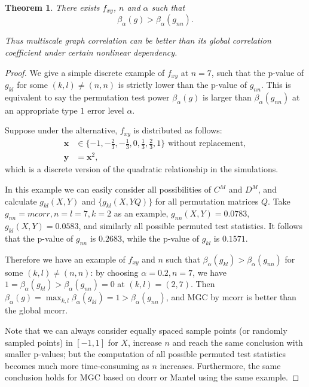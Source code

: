 \documentclass[11pt]{article}
\providecommand{\mb}[1]{\boldsymbol{#1}}
\newtheorem{thm}{Theorem}
\begin{document}
\begin{thm}
There exists $f_{xy}$, $n$ and $\alpha$ such that 
\begin{equation}
\beta_{\alpha}(g) > \beta_{\alpha}(g_{nn}).
\end{equation}

Thus multiscale graph correlation can be better than its global correlation coefficient under certain nonlinear dependency.
\end{thm}
\begin{proof}
We give a simple discrete example of $f_{xy}$ at $n=7$, such that the p-value of $g_{kl}$ for some $(k,l) \neq (n,n)$ is strictly lower than the p-value of $g_{nn}$. This is equivalent to say the permutation test power $\beta_{\alpha}(g)$ is larger than $\beta_{\alpha}(g_{nn})$ at an appropriate type $1$ error level $\alpha$.

Suppose under the alternative, $f_{xy}$ is distributed as follows:
\begin{align*} 
\mb{x} &\in \{-1,-\frac{2}{3},-\frac{1}{3},0,\frac{1}{3},\frac{2}{3},1\} \mbox{ without replacement}, \\
\mb{y} &= \mb{x}^2,
\end{align*}
which is a discrete version of the quadratic relationship in the simulations.

In this example we can easily consider all possibilities of $C^{M}$ and $D^{M}$, and calculate $g_{kl}(X, Y)$ and $\{g_{kl}(X, YQ)\}$ for all permutation matrices $Q$. Take $g_{nn}=mcorr, n=l=7, k=2$ as an example, $g_{nn}(X, Y)=0.0783$, $g_{kl}(X, Y)=0.0583$, and similarly all possible permuted test statistics. It follows that the p-value of $g_{nn}$ is $0.2683$, while the p-value of $g_{kl}$ is $0.1571$. 

Therefore we have an example of $f_{xy}$ and $n$ such that $\beta_{\alpha}(g_{kl}) > \beta_{\alpha}(g_{nn})$ for some $(k,l) \neq (n,n)$: by choosing $\alpha=0.2, n=7$, we have $1=\beta_{\alpha}(g_{kl}) > \beta_{\alpha}(g_{nn})=0$ at $(k,l)=(2,7)$. Then $\beta_{\alpha}(g)=\max_{k,l}{\beta_{\alpha}(g_{kl})}=1>\beta_{\alpha}(g_{nn})$, and MGC by mcorr is better than the global mcorr.

Note that we can always consider equally spaced sample points (or randomly sampled points) in $[-1,1]$ for $X$, increase $n$ and reach the same conclusion with smaller p-values; but the computation of all possible permuted test statistics becomes much more time-consuming as $n$ increases. Furthermore, the same conclusion holds for MGC based on dcorr or Mantel using the same example.
\end{proof}




\end{document}
